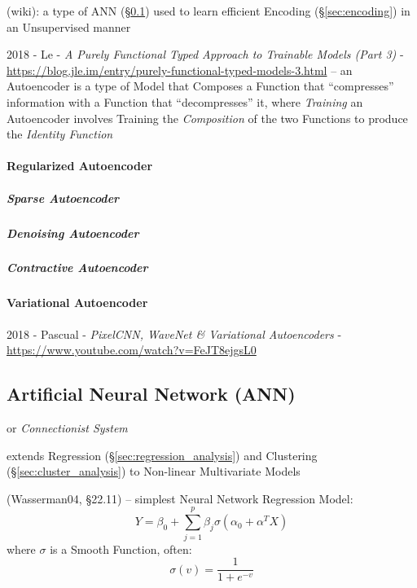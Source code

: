 (wiki): a type of ANN (\S\ref{sec:ann}) used to learn efficient Encoding
(\S\ref{sec:encoding}) in an Unsupervised manner

2018 - Le -
\emph{A Purely Functional Typed Approach to Trainable Models (Part 3)} -
\url{https://blog.jle.im/entry/purely-functional-typed-models-3.html}
--
an Autoencoder is a type of Model that Composes a Function that ``compresses''
information with a Function that ``decompresses'' it, where \emph{Training} an
Autoencoder involves Training the \emph{Composition} of the two Functions to
produce the \emph{Identity Function}



\paragraph{Regularized Autoencoder}\label{sec:regularized_autoencoder}\hfill

\subparagraph{Sparse Autoencoder}\label{sec:sparse_autoencoder}\hfill

\subparagraph{Denoising Autoencoder}\label{sec:denoising_autoencoder}\hfill

\subparagraph{Contractive Autoencoder}\label{sec:contractive_autoencoder}\hfill



\paragraph{Variational Autoencoder}\label{sec:variational_autoencoder}\hfill

2018 - Pascual - \emph{PixelCNN, WaveNet & Variational Autoencoders} -
\url{https://www.youtube.com/watch?v=FeJT8ejgsL0}



\subsection{Artificial Neural Network (ANN)}\label{sec:ann}


or \emph{Connectionist System}

extends Regression (\S\ref{sec:regression_analysis}) and Clustering
(\S\ref{sec:cluster_analysis}) to Non-linear Multivariate Models

(Wasserman04, \S22.11) --
simplest Neural Network Regression Model:
\[
  Y = \beta_0 + \sum_{j=1}^p \beta_j \sigma (\alpha_0 + \alpha^T X)
\]
where $\sigma$ is a Smooth Function, often:
\[
  \sigma(v) = \frac{1}{1 + e^{-v}}
\]

